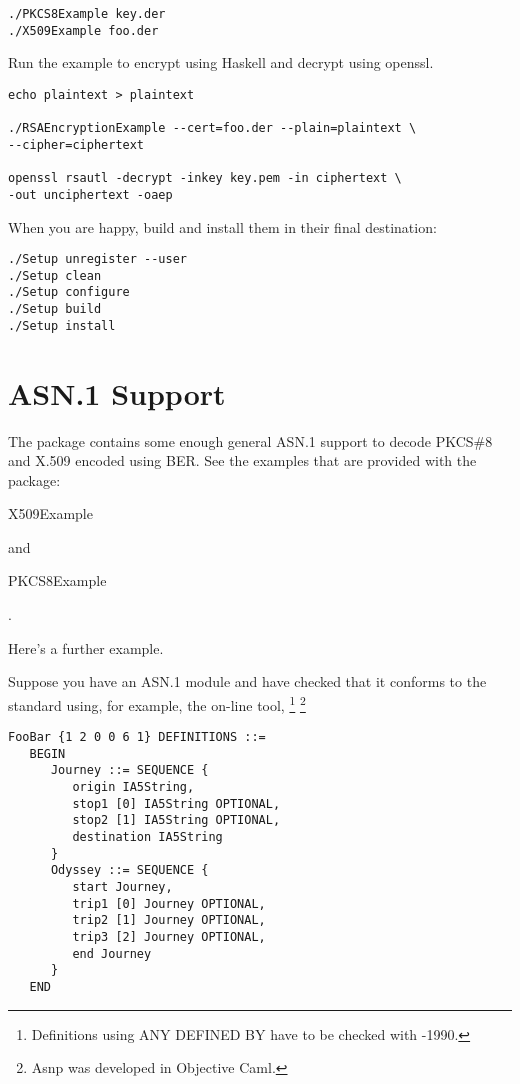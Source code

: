 \documentclass{article}
\begin{document}
\begin{lstlisting}[frame=single]
./PKCS8Example key.der
./X509Example foo.der
\end{lstlisting}

Run the example to encrypt using Haskell and decrypt using openssl.

\begin{lstlisting}[frame=single]
echo plaintext > plaintext

./RSAEncryptionExample --cert=foo.der --plain=plaintext \
--cipher=ciphertext

openssl rsautl -decrypt -inkey key.pem -in ciphertext \ 
-out unciphertext -oaep
\end{lstlisting}

When you are happy, build and install them in
their final destination:

\begin{lstlisting}[frame=single]
./Setup unregister --user
./Setup clean
./Setup configure
./Setup build
./Setup install
\end{lstlisting}

\section{ASN.1 Support}

The package contains some enough general ASN.1 support to decode PKCS\#8 and
X.509 encoded using BER. See the examples that
are provided with the package: \begin{tt}X509Example\end{tt} and
\begin{tt}PKCS8Example\end{tt}.

Here's a further example.

Suppose you have an ASN.1 module and have checked that it conforms to
the standard using, for example, 
the on-line tool, 
\footnote{Definitions using ANY DEFINED BY have to be checked with -1990.}
\footnote{Asnp was developed in Objective Caml.}

\lstset{language=ASN1}
\begin{lstlisting}[frame=single]
FooBar {1 2 0 0 6 1} DEFINITIONS ::= 
   BEGIN 
      Journey ::= SEQUENCE {
         origin IA5String,
         stop1 [0] IA5String OPTIONAL,
         stop2 [1] IA5String OPTIONAL,
         destination IA5String
      }
      Odyssey ::= SEQUENCE {
         start Journey,
         trip1 [0] Journey OPTIONAL,
         trip2 [1] Journey OPTIONAL,
         trip3 [2] Journey OPTIONAL,
         end Journey
      }
   END 
\end{lstlisting}
\end{document}

